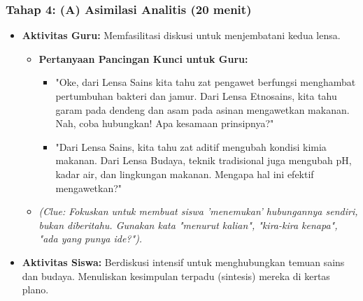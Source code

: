 \documentclass[a4paper,12pt]{article}
\begin{document}
\subsubsection{Tahap 4: (A) Asimilasi Analitis (20 menit)}
\begin{itemize}
\item \textbf{Aktivitas Guru:} Memfasilitasi diskusi untuk menjembatani kedua lensa.
    \begin{itemize}
    \item \textbf{Pertanyaan Pancingan Kunci untuk Guru:}
        \begin{itemize}
        \item "Oke, dari Lensa Sains kita tahu zat pengawet berfungsi menghambat pertumbuhan bakteri dan jamur. Dari Lensa Etnosains, kita tahu garam pada dendeng dan asam pada asinan mengawetkan makanan. Nah, coba hubungkan! Apa kesamaan prinsipnya?"
        \item "Dari Lensa Sains, kita tahu zat aditif mengubah kondisi kimia makanan. Dari Lensa Budaya, teknik tradisional juga mengubah pH, kadar air, dan lingkungan makanan. Mengapa hal ini efektif mengawetkan?"
        \end{itemize}
    \item \textit{(Clue: Fokuskan untuk membuat siswa 'menemukan' hubungannya sendiri, bukan diberitahu. Gunakan kata "menurut kalian", "kira-kira kenapa", "ada yang punya ide?").}
    \end{itemize}
\item \textbf{Aktivitas Siswa:} Berdiskusi intensif untuk menghubungkan temuan sains dan budaya. Menuliskan kesimpulan terpadu (sintesis) mereka di kertas plano.
\end{itemize}
\end{document}
